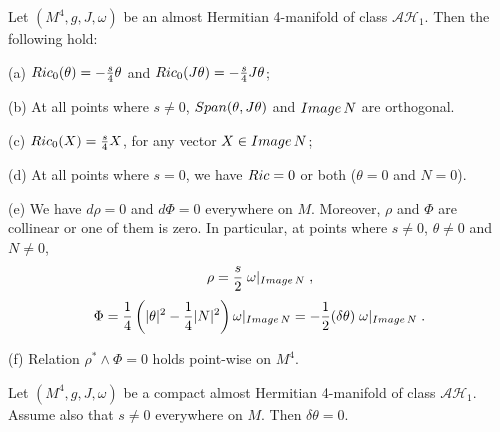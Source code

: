 \documentclass[10pt,a4paper]{amsart}
\begin{document}
\begin{prop} \label{ah1-facts}
Let $(M^4, g, J, \omega)$ be an almost Hermitian 4-manifold of class $\mathcal{AH}_1$. Then the following hold:

\vspace{0.2cm}
(a) ${\rm Ric}_0(\theta) = -\frac{s}{4} \theta$ and ${\rm Ric}_0(J\theta) = -\frac{s}{4} J\theta$;

\vspace{0.2cm}
(b) At all points where $s \neq 0$, ${\rm Span}(\theta, J\theta)$ and ${\rm Image} \, N $ are orthogonal. 

\vspace{0.2cm}

(c) ${\rm Ric}_0(X) = \frac{s}{4} X$, for any vector $ X \in {\rm Image} \, N$;

\vspace{0.2cm}

(d) At all points where $s = 0$, we have ${\rm Ric} = 0$ or both ($\theta = 0$ and $N=0$).

\vspace{0.2cm}

(e) We have $d \rho = 0$ and $d \Phi = 0$ everywhere on $M$. Moreover,  $\rho$ and $\Phi$ are collinear or one of them is zero. In particular, at points where $s\neq 0$, $\theta \neq 0$ and $N\neq 0$, 
$$\rho = \frac{s}{2} \; \omega|_{{\rm Image}\, N}  \; ,$$
$$ \Phi = \frac{1}{4} \left( |\theta|^2 - \frac{1}{4}|N|^2 \right) \omega|_{{\rm Image}\, N} = -\frac{1}{2} (\delta \theta)\; \omega|_{{\rm Image}\, N}\; .$$

\vspace{0.2cm}

(f) Relation $\rho^* \wedge \Phi = 0$ holds point-wise on $M^4$.
\end{prop}

\begin{prop} \label{ah1-Gaud}
    Let $(M^4, g, J, \omega)$ be a compact almost Hermitian 4-manifold of class $\mathcal{AH}_1$. Assume also that $s\neq 0$ everywhere on $M$. Then $\delta \theta = 0$. 
\end{prop}
\end{document}
